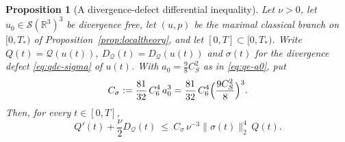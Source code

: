\documentclass[11pt]{article}
\newtheorem{proposition}[theorem]{Proposition}
\theoremstyle{definition}
\theoremstyle{plain}
\newcommand{\R}{\mathbb R}
\newcommand{\norm}[1]{\lVert #1\rVert}
\begin{document}
\begin{proposition}[A divergence-defect differential inequality]
\label{prop:qe-defect-criterion}
Let $\nu>0$, let $u_0\in\mathcal S(\R^3)^3$ be divergence free, let $(u,p)$
be the maximal classical branch on $[0,T_*)$ of
Proposition~\ref{prop:localtheory}, and let $[0,T]\subset[0,T_*)$.  Write
$Q(t)=\mathcal Q(u(t))$, $D_{\mathcal Q}(t)=D_{\mathcal Q}(u(t))$ and
$\sigma(t)$ for the divergence defect \eqref{eq:qdc-sigma} of $u(t)$.  With
$a_0=\frac98C_S^2$ as in \eqref{eq:qe-a0}, put
\begin{equation}\label{eq:qe-Csigma}
 C_\sigma:=\frac{81}{32}\,C_6^4\,a_0^3
 =\frac{81}{32}\,C_6^4\Bigl(\frac{9C_S^2}8\Bigr)^{3}.
\end{equation}
Then, for every $t\in[0,T]$,
\begin{equation}\label{eq:qe-defect-diff}
 Q'(t)+\frac\nu2D_{\mathcal Q}(t)
 \ \le\ C_\sigma\,\nu^{-3}\norm{\sigma(t)}_2^4\,Q(t).
\end{equation}
\end{proposition}
\end{document}
